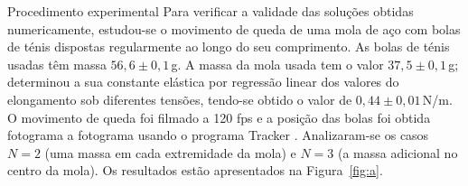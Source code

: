 \documentclass[final]{beamer}
\newlength{\colwidth}
\begin{document}
\begin{frame}[t]
\begin{columns}[t]
\begin{column}{\colwidth}
\begin{block}{Procedimento experimental}
Para verificar a validade das soluções obtidas numericamente, estudou-se o
movimento de queda de uma mola de aço com bolas de ténis dispostas
regularmente ao longo do seu comprimento.  As bolas de ténis usadas têm massa
$56,6\pm0,1$\,g.  A massa da mola usada tem o valor $37,5\pm0,1$\,g;
determinou a sua constante elástica por regressão linear dos valores do
elongamento sob diferentes tensões, tendo-se obtido o valor de
$0,44\pm0,01$\,N/m.  O movimento de queda foi filmado a 120 fps e a posição das
bolas foi obtida fotograma a fotograma usando o programa Tracker \cite{Tracker}.
Analizaram-se os casos $N=2$ (uma massa em cada extremidade da mola) e $N=3$ (a
massa adicional no centro da mola). Os resultados estão apresentados na
Figura~\ref{fig:a}.


\end{block}
\end{column}
\end{columns}
\end{frame}
\end{document}
